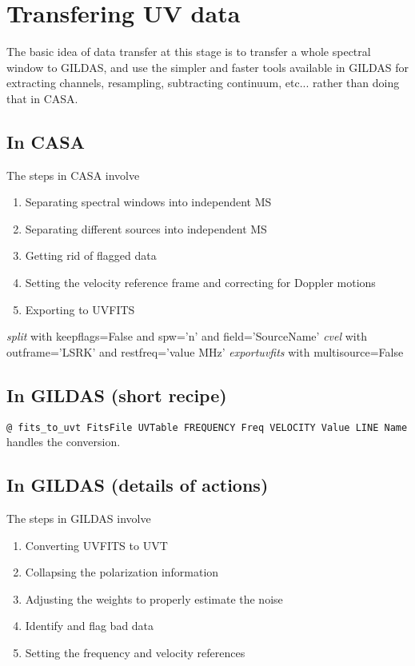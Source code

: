 \documentclass[11pt]{article}
\begin{document}
\section{Transfering UV data}

The basic idea of data transfer at this stage is to transfer
a whole spectral window to GILDAS, and use the simpler and faster
tools available in GILDAS for extracting channels, resampling,
subtracting continuum, etc... rather than doing that in CASA.

\subsection{In CASA}
The steps in CASA involve
\begin{enumerate}
\item Separating spectral windows into independent MS
\item Separating different sources into independent MS
\item Getting rid of flagged data 
\item Setting the velocity reference frame and correcting
for Doppler motions
\item Exporting to UVFITS 
\end{enumerate}

\textit{split} with keepflags=False   and spw='n'  and field='SourceName'
\textit{cvel}  with  outframe='LSRK'  and restfreq='value MHz'
\textit{exportuvfits}  with multisource=False

\subsection{In GILDAS (short recipe)}
\texttt{@ fits\_to\_uvt FitsFile UVTable FREQUENCY Freq VELOCITY Value LINE Name}\\
handles the conversion.  


\subsection{In GILDAS (details of actions)}
The steps in GILDAS involve
\begin{enumerate}
\item Converting UVFITS to UVT
\item Collapsing the polarization information
\item Adjusting the weights to properly estimate the noise
\item Identify and flag bad data
\item Setting the frequency and velocity references
\end{enumerate}
\end{document}
